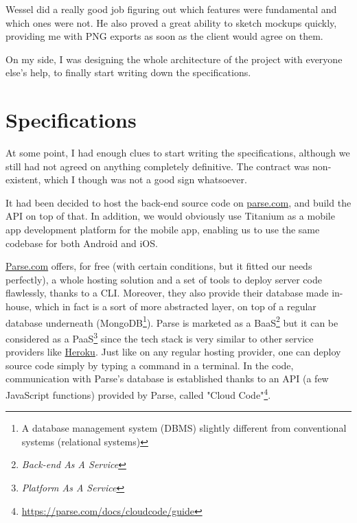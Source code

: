 Wessel did a really good job figuring out which features were fundamental and which ones were not. He also proved a great ability to sketch mockups quickly, providing me with PNG exports as soon as the client would agree on them.

\medskip

On my side, I was designing the whole architecture of the project with everyone else's help, to finally start writing down the specifications.

\section{Specifications}

At some point, I had enough clues to start writing the specifications, although we still had not agreed on anything completely definitive. The contract was non-existent, which I though was not a good sign whatsoever.

\medskip

It had been decided to host the back-end source code on \href{https://www.parse.com}{parse.com}, and build the API on top of that. In addition, we would obviously use Titanium as a mobile app development platform for the mobile app, enabling us to use the same codebase for both Android and iOS.

\medskip

\href{https://www.parse.com}{Parse.com} offers, for free (with certain conditions, but it fitted our needs perfectly), a whole hosting solution and a set of tools to deploy server code flawlessly, thanks to a CLI. Moreover, they also provide their database made in-house, which in fact is a sort of more abstracted layer, on top of a regular database underneath (MongoDB\footnote{A database management system (DBMS) slightly different from conventional systems (relational systems)}). Parse is marketed as a BaaS\footnote{\textit{Back-end As A Service}} but it can be considered as a PaaS\footnote{\textit{Platform As A Service}} since the tech stack is very similar to other service providers like \href{https://www.heroku.com/}{Heroku}. Just like on any regular hosting provider, one can deploy source code simply by typing a command in a terminal. In the code, communication with Parse's database is established thanks to an API (a few JavaScript functions) provided by Parse, called "Cloud Code"\footnote{\href{https://parse.com/docs/cloudcode/guide}{https://parse.com/docs/cloudcode/guide}}.

\medskip

